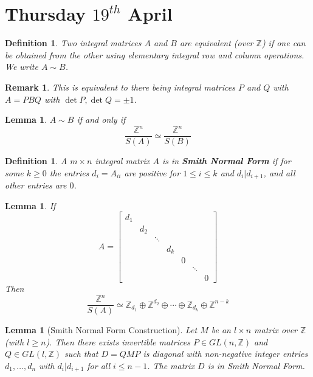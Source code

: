 \documentclass[a4paper,10pt]{article}
\newcommand{\ZZ}{\mathbb{Z}}
\newtheorem{Def}[thm]{Definition}
\newtheorem{Lem}[thm]{Lemma}
\newtheorem{rem}[thm]{Remark}
\begin{document}
\section{Thursday $19^{th}$ April}

\begin{Def}
Two integral matrices $A$ and $B$ are equivalent (over $\ZZ$) if one can be obtained from the other using elementary integral row and column operations.  We write $A \sim B$. 
\end{Def}

\begin{rem}
This is equivalent to there being integral matrices $P$ and $Q$ with $A = PBQ$ with $\det P, \det Q = \pm 1$. 
\end{rem}

\begin{Lem}
$A \sim B$ if and only if 
\[ \frac{\ZZ^n}{S(A)} \simeq \frac{\ZZ^n}{S(B)} \]
\end{Lem}

\begin{Def}
A $m\times n$ integral matrix $A$ is in \textbf{Smith Normal Form} if for some $k \geq 0$ the entries $d_i = A_{ii}$ are positive for $1 \leq i \leq k$ and $d_i | d_{i+1}$, and all other entries are $0$.  
\end{Def}

\begin{Lem}
If 
\[A = \begin{bmatrix} d_1 \\
                        & d_2 \\
                        & &\ddots \\
                        & &       & d_k \\
                        & &  &             & 0 \\
                        & &  & &                & \ddots \\
                        & &  & & &                   & 0
 \end{bmatrix} \]
Then 
\[ \frac{\ZZ^n}{S(A)} \simeq \ZZ_{d_1} \oplus \ZZ^{d_2} \oplus \cdots \oplus \ZZ_{d_k} \oplus \ZZ^{n - k} \]
\end{Lem}

\begin{Lem}[Smith Normal Form Construction]
Let $M$ be an $l \times n$ matrix over $\ZZ$ (with $l \geq n$). Then there exists invertible matrices $P \in GL(n,\ZZ)$ and $Q \in GL(l,\ZZ)$ such that $D = QMP$ is diagonal with non-negative integer entries $d_1, \dots, d_n$ with $d_i | d_{i+1}$ for all $i \leq n-1$. The matrix $D$ is in Smith Normal Form.
\end{Lem}
\end{document}
